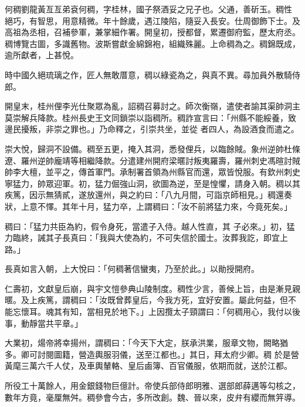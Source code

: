 \begin{pinyinscope}
 何稠劉龍黃亙亙弟袞何稠，字桂林，國子祭酒妥之兄子也。父通，善斫玉。稠性
 絕巧，有智思，用意精微。年十餘歲，遇江陵陷，隨妥入長安。仕周御飾下士。及高祖為丞相，召補參軍，兼掌細作署。開皇初，授都督，累遷御府監，歷太府丞。稠博覽古圖，多識舊物。波斯嘗獻金綿錦袍，組織殊麗。上命稠為之。稠錦既成，逾所獻者，上甚悅。



 時中國久絕琉璃之作，匠人無敢厝意，稠以綠瓷為之，與真不異。尋加員外散騎侍郎。



 開皇末，桂州俚李光仕聚眾為亂，詔稠召募討之。師次衡嶺，遣使者諭其渠帥洞主莫崇解兵降款。桂州長史王文同鎖崇以詣稠所。稠詐宣言曰：「州縣不能綏養，致邊民擾叛，非崇之罪也。」乃命釋之，引崇共坐，並從
 者四人，為設酒食而遣之。



 崇大悅，歸洞不設備。稠至五更，掩入其洞，悉發俚兵，以臨餘賊。象州逆帥杜條遼、羅州逆帥龐靖等相繼降款。分遣建州開府梁暱討叛夷羅壽，羅州刺史馮暄討賊帥李大檀，並平之，傳首軍門。承制署首領為州縣官而還，眾皆悅服。有欽州刺史寧猛力，帥眾迎軍。初，猛力倔強山洞，欲圖為逆，至是惶懼，請身入朝。稠以其疾篤，因示無猜貳，遂放還州，與之約曰：「八九月間，可詣京師相見。」稠還奏狀，上意不懌。其年十月，猛力卒，上謂稠曰：「汝不前將猛力來，今竟死矣。」



 稠曰：「猛力共臣為約，假令身死，當遣子入侍。越人性直，其
 子必來。」初，猛力臨終，誡其子長真曰：「我與大使為約，不可失信於國士。汝葬我訖，即宜上路。」



 長真如言入朝，上大悅曰：「何稠著信蠻夷，乃至於此。」以勛授開府。



 仁壽初，文獻皇后崩，與宇文愷參典山陵制度。稠性少言，善候上旨，由是漸見親暱。及上疾篤，謂稠曰：「汝既曾葬皇后，今我方死，宜好安置。屬此何益，但不能忘懷耳。魂其有知，當相見於地下。」上因攬太子頸謂曰：「何稠用心，我付以後事，動靜當共平章。」



 大業初，煬帝將幸揚州，謂稠曰：「今天下大定，朕承洪業，服章文物，闕略猶多。卿可討閱圖籍，營造輿服羽儀，送至江都也。」其日，拜太府少卿。稠
 於是營黃麾三萬六千人仗，及車輿輦輅、皇后鹵簿、百官儀服，依期而就，送於江都。



 所役工十萬餘人，用金銀錢物巨億計。帝使兵部侍郎明雅、選部郎薛邁等勾核之，數年方竟，毫厘無舛。稠參會今古，多所改創。魏、晉以來，皮弁有纓而無笄導。




\end{pinyinscope}
